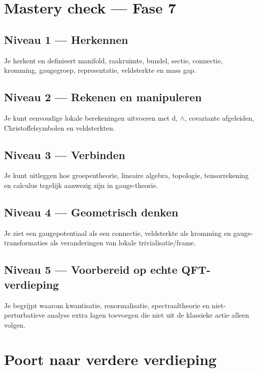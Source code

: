 \documentclass[11pt,a4paper]{article}
\newcommand{\dd}{\mathrm{d}}
\begin{document}
\section{Mastery check --- Fase 7}

\subsection*{Niveau 1 --- Herkennen}
Je herkent en definieert manifold, raakruimte, bundel, sectie, connectie, kromming, gaugegroep, representatie, veldsterkte en mass gap.

\subsection*{Niveau 2 --- Rekenen en manipuleren}
Je kunt eenvoudige lokale berekeningen uitvoeren met $\dd$, $\wedge$, covariante afgeleiden, Christoffelsymbolen en veldsterkten.

\subsection*{Niveau 3 --- Verbinden}
Je kunt uitleggen hoe groepentheorie, lineaire algebra, topologie, tensorrekening en calculus tegelijk aanwezig zijn in gauge-theorie.

\subsection*{Niveau 4 --- Geometrisch denken}
Je ziet een gaugepotentiaal als een connectie, veldsterkte als kromming en gauge-transformaties als veranderingen van lokale trivialisatie/frame.

\subsection*{Niveau 5 --- Voorbereid op echte QFT-verdieping}
Je begrijpt waarom kwantisatie, renormalisatie, spectraaltheorie en niet-perturbatieve analyse extra lagen toevoegen die niet uit de klassieke actie alleen volgen.

\section{Poort naar verdere verdieping}
\end{document}
